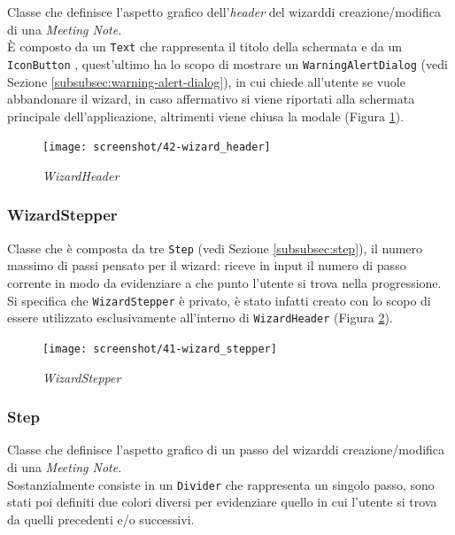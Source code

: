 Classe che definisce l'aspetto grafico dell'\emph{header} del \gls{wizard}\glsoccur di creazione/modifica di una \emph{Meeting Note}.\\
È composto da un \lstinline{Text} \cite{site:text} che rappresenta il titolo della schermata e da un \lstinline{IconButton} \cite{site:icon-button}, quest'ultimo ha lo scopo di mostrare un \lstinline{WarningAlertDialog} (vedi Sezione \ref{subsubsec:warning-alert-dialog}), in cui chiede all'utente se vuole abbandonare il \gls{wizard}\glsoccur, in caso affermativo si viene riportati alla schermata principale dell'applicazione, altrimenti viene chiusa la modale (Figura \ref{fig:wizard-header}). 

\begin{figure}[!h] 
    \centering 
    \texttt{[image: screenshot/42-wizard\_header]} 
    \caption{\emph{WizardHeader}}
    \label{fig:wizard-header}
\end{figure}

\subsubsection*{WizardStepper}
\label{subsubsec:wizard-stepper}

Classe che è composta da tre \lstinline{Step} (vedi Sezione \ref{subsubsec:step}), il numero massimo di passi pensato per il \gls{wizard}\glsoccur: riceve in input il numero di passo corrente in modo da evidenziare a che punto l'utente si trova nella progressione.
Si specifica che \lstinline{WizardStepper} è privato, è stato infatti creato con lo scopo di essere utilizzato esclusivamente all'interno di \lstinline{WizardHeader} (Figura \ref{fig:wizard-stepper}).\\

\begin{figure}[!h] 
    \centering 
    \texttt{[image: screenshot/41-wizard\_stepper]} 
    \caption{\emph{WizardStepper}}
    \label{fig:wizard-stepper}
\end{figure}

\subsubsection*{Step}
\label{subsubsec:step}

Classe che definisce l'aspetto grafico di un passo del \gls{wizard}\glsoccur di creazione/modifica di una \emph{Meeting Note}.\\
Sostanzialmente consiste in un \lstinline{Divider} \cite{site:divider} che rappresenta un singolo passo, sono stati poi definiti due colori diversi per evidenziare quello in cui l'utente si trova da quelli precedenti e/o successivi.

